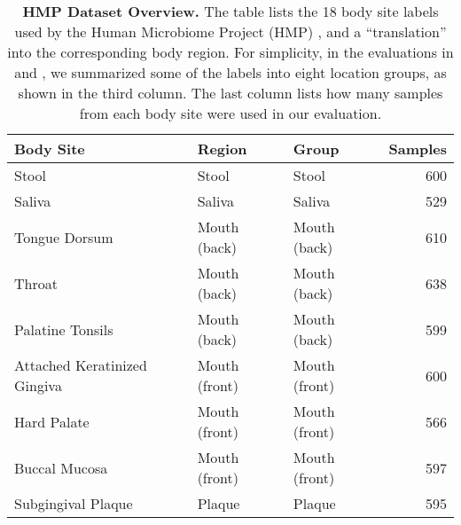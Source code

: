 \begin{table}[htb]
\caption[HMP Dataset Overview]{
\textbf{HMP Dataset Overview.}
The table lists the \num{18} body site labels used by the Human Microbiome Project (HMP) \cite{Huttenhower2012,Methe2012},
and a ``translation'' into the corresponding body region.
For simplicity, in the evaluations in  and
,
we summarized some of the labels into eight location groups, as shown in the third column.
The last column lists how many samples from each body site were used in our evaluation.
}
\label{tab:hmp_data_overview}
{
    \begin{center}
    \begin{tabular}{lllr}
        \toprule
        Body Site                       & Region            & Group             & Samples   \\
        \midrule
        Stool                           & Stool             & Stool             & 600   \\
        Saliva                          & Saliva            & Saliva            & 529   \\
        Tongue Dorsum                   & Mouth (back)      & Mouth (back)      & 610   \\
        Throat                          & Mouth (back)      & Mouth (back)      & 638   \\
        Palatine Tonsils                & Mouth (back)      & Mouth (back)      & 599   \\
        Attached Keratinized Gingiva    & Mouth (front)     & Mouth (front)     & 600   \\
        Hard Palate                     & Mouth (front)     & Mouth (front)     & 566   \\
        Buccal Mucosa                   & Mouth (front)     & Mouth (front)     & 597   \\
        Subgingival Plaque              & Plaque            & Plaque            & 595   \\

\end{tabular}
\end{center}}
\end{table}
